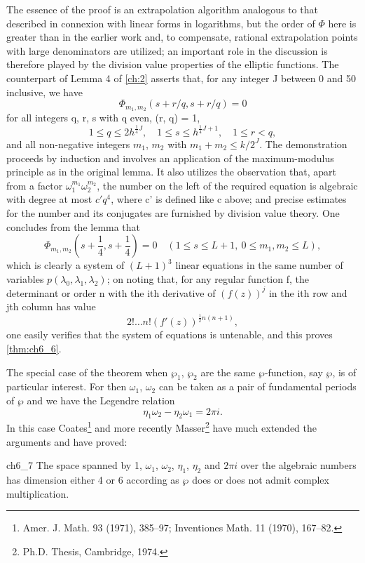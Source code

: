 The essence of the proof is an extrapolation algorithm analogous to that described in connexion with linear forms in logarithms, but the order of $\Phi$ here is greater than in the earlier work and, to compensate, rational extrapolation points with large denominators are utilized; an important role in the discussion is therefore played by the division value properties of the elliptic functions. The counterpart of Lemma 4 of \autoref{ch:2} asserts that, for any integer J between 0 and 50 inclusive, we have
\[\Phi_{m_1, m_2}(s + r/q, s + r/q) = 0\]
for all integers q, r, s with q even, (r, q) = 1,
\[1\leqslant q\leqslant 2h^{\frac{1}{4}J},\quad 1\leqslant s\leqslant h^{\frac{1}{4}J+1},\quad 1\leqslant r< q,\]
and all non-negative integers $m_1$, $m_2$ with $m_1 + m_2 \leq k/2^J$. The demonstration proceeds by induction and involves an application of the maximum-modulus principle as in the original lemma. It also utilizes the observation that, apart from a factor $\omega_1^{m_1}\omega_2^{m_2}$, the number on the left of the required equation is algebraic with degree at most $c'q^4$, where c' is defined like c above; and precise estimates for the number and its conjugates are furnished by division value theory. One concludes from the lemma that
\[\Phi_{m_1, m_2}(s+\frac{1}{4}, s+\frac{1}{4}) = 0 \quad (1 \le s \le L+1, \ 0 \le m_1, m_2 \le L),\]
which is clearly a system of $(L+1)^3$ linear equations in the same number of variables $p(\lambda_0, \lambda_1, \lambda_2)$; on noting that, for any regular function f, the determinant or order n with the ith derivative of $(f(z))^j$ in the ith row and jth column has value
\[2! \dots n! (f'(z))^{\frac{1}{2}n(n+1)},\]
one easily verifies that the system of equations is untenable, and this proves \autoref{thm:ch6_6}.

The special case of the theorem when $\wp_1$, $\wp_2$ are the same $\wp$-function, say $\wp$, is of particular interest. For then $\omega_1$, $\omega_2$ can be taken as a pair of fundamental periods of $\wp$ and we have the Legendre relation
\[\eta_1\omega_2-\eta_2\omega_1=2\pi i.\]
In this case Coates\footnote{Amer. J. Math. 93 (1971), 385--97; Inventiones Math. 11 (1970), 167--82.} and more recently Masser\footnote{Ph.D. Thesis, Cambridge, 1974.} have much extended the arguments and have proved:

\begin{mythm}{}{ch6_7}
The space spanned by 1, $\omega_1$, $\omega_2$, $\eta_1$, $\eta_2$ and $2\pi i$ over the algebraic numbers has dimension either 4 or 6 according as $\wp$ does or does not admit complex multiplication.
\end{mythm}

